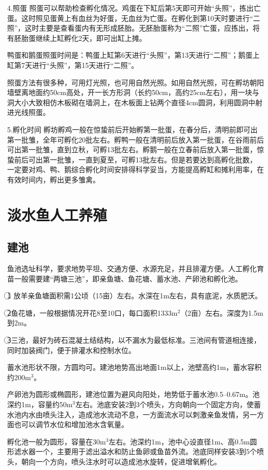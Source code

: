 \documentclass{ctexbook}
\begin{document}
4.照蛋 照蛋可以帮助检查孵化情况。鸡蛋在下缸后第5天即可开始“头照”，拣出亡蛋。这时照见蛋黄上有血丝为好蛋，无血丝为亡蛋。在孵化到第10天时要进行“二照”，这时主要是查看蛋内有无形成胚胎。无胚胎蛋称为“二照”亡蛋，应拣出，将有胚胎蛋继续上缸孵化2天，即可出缸上摊。

鸭蛋和鹅蛋照蛋时间是：鸭蛋上缸第6天进行“头照”，第13天进行“二照”；鹅蛋上缸第7天进行“头照”，第15天进行“二照”。

照蛋方法有很多种，可用灯光照，也可用自然光照。如用自然光照，可在孵坊朝阳墙壁离地面约50cm高处，开一长方形洞（长约50cm，高约25cm左右），用一块与洞大小大致相仿木板砌在墙洞上，在木板面上钻两个直径4cm圆洞，利用圆洞中射进光线照蛋。

5.孵化时间 孵坊孵鸡一般在惊蛰前后开始孵第一批蛋，在春分后，清明前即可出第一批雏，全年可孵化20批左右。孵鸭一般在清明前后放入第一批蛋，在谷雨前后可出第一批雏，直到立秋，可孵13批左右。孵鹅一般在立春前后放入第一批蛋，惊蛰前后可出第一批雏，一直到夏至，可孵13批左右。但是若要达到高孵化批数， 一定要对鸡、鸭、鹅综合孵化时间安排得科学妥当，方能提高孵缸和摊利用率，在有效时间内，孵出更多雏禽。
\section{淡水鱼人工养殖}
\subsection{建池}
鱼池选址科学，要求地势平坦、交通方便、水源充足，并且排灌方便。人工孵化育苗一般需要建“两塘三池”，即亲鱼塘、鱼花塘、蓄水池、产卵池和孵化池。

\textcircled{1} 放羊亲鱼塘面积需1公顷（15亩）左右。水深在1m左右，具有底泥，水质肥沃。

\textcircled{2}鱼花塘，一般根据情况开花8至10口，每口面积1333m$^{2}$（2亩）左右。深度为1.5m到2m。

\textcircled{3}三池，最好为砖石混凝土结结构，以不漏水为最低标准。三池间有管道相连接，同时加装阀门，便于排灌水和控制水位。

蓄水池形状不限，方圆均可。建池地势高出地面1m以上，池壁高约1m，蓄水容积约200m$^{3}$。

产卵池为圆形或椭圆形，建池位置为避风向阳处，地势低于蓄水池0.5--0.67m。池深约1m，容量约50m$^{3}$左右。池底安装2到3个喷头，方向朝向一个固定方向，使蓄水池内水由喷头注入，造成池水流动不息，一方面流水可以刺激亲鱼发情，另一方面也可以调节水位和增加池水含氧量。

孵化池一般为圆形，容量在30m$^{3}$左右。池深约1m，池中心设直径1m、高0.5m圆形滤水器一个，主要用于滤出溢水和防止鱼卵或鱼苗外流。池底同样安装3到5个喷头，朝向一个方向，喷头注水时可以造成池水旋转，促进增氧孵化。
\end{document}
